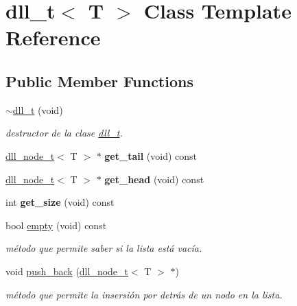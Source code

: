 \hypertarget{classdll__t}{}\section{dll\+\_\+t$<$ T $>$ Class Template Reference}
\label{classdll__t}
\subsection*{Public Member Functions}
\begin{DoxyCompactItemize}
\item 
\mbox{\label{classdll__t_a27a43b1367cffa4af8a3551d4373cdf1}} 
\hyperlink{classdll__t_a27a43b1367cffa4af8a3551d4373cdf1}{$\sim$dll\+\_\+t} (void)
\begin{DoxyCompactList}\small\item\em destructor de la clase \hyperlink{classdll__t}{dll\+\_\+t}. \end{DoxyCompactList}\item 
\mbox{\label{classdll__t_a4283a6fb9a55ff1eed9b7a1fa2bf539c}} 
\hyperlink{classdll__node__t}{dll\+\_\+node\+\_\+t}$<$ T $>$ $\ast$ {\bfseries get\+\_\+tail} (void) const
\item 
\mbox{\label{classdll__t_adbe6e0e833d5aa9f101444deb31664ec}} 
\hyperlink{classdll__node__t}{dll\+\_\+node\+\_\+t}$<$ T $>$ $\ast$ {\bfseries get\+\_\+head} (void) const
\item 
\mbox{\label{classdll__t_a46a23a1f8a930f72fa6e8e8059e2e4dc}} 
int {\bfseries get\+\_\+size} (void) const
\item 
\mbox{\label{classdll__t_a103fc51e7aeb0f2e0874aa82fa44f0ab}} 
bool \hyperlink{classdll__t_a103fc51e7aeb0f2e0874aa82fa44f0ab}{empty} (void) const
\begin{DoxyCompactList}\small\item\em método que permite saber si la lista está vacía. \end{DoxyCompactList}\item 
void \hyperlink{classdll__t_aa8cd054c192aa86ac418a2941c1c02ba}{push\+\_\+back} (\hyperlink{classdll__node__t}{dll\+\_\+node\+\_\+t}$<$ T $>$ $\ast$)
\begin{DoxyCompactList}\small\item\em método que permite la insersión por detrás de un nodo en la lista. \end{DoxyCompactList}\item 

\end{DoxyCompactItemize}
